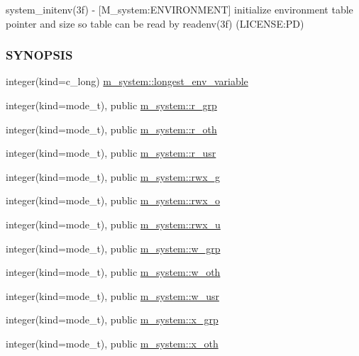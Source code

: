 \begin{DoxyCompactItemize}
\begin{DoxyCompactList}
system\+\_\+initenv(3f) -\/ \mbox{[}M\+\_\+system\+:E\+N\+V\+I\+R\+O\+N\+M\+E\+NT\mbox{]} initialize environment table pointer and size so table can be read by readenv(3f) (L\+I\+C\+E\+N\+SE\+:PD) \subsubsection*{S\+Y\+N\+O\+P\+S\+IS}\end{DoxyCompactList}\item 
integer(kind=c\+\_\+long) \mbox{\hyperlink{namespacem__system_ac066b6866f8ef4b8c358ec8daca7566c}{m\+\_\+system\+::longest\+\_\+env\+\_\+variable}}
\item 
integer(kind=mode\+\_\+t), public \mbox{\hyperlink{namespacem__system_a9f6b88434cd895d01081eead0ec994e9}{m\+\_\+system\+::r\+\_\+grp}}
\item 
integer(kind=mode\+\_\+t), public \mbox{\hyperlink{namespacem__system_a144868e3f7e98d339ba59eac96a413b7}{m\+\_\+system\+::r\+\_\+oth}}
\item 
integer(kind=mode\+\_\+t), public \mbox{\hyperlink{namespacem__system_a26b623dd9e8e115960edbb0f252ccf6b}{m\+\_\+system\+::r\+\_\+usr}}
\item 
integer(kind=mode\+\_\+t), public \mbox{\hyperlink{namespacem__system_a23010fa4addcb4c58b4cb0334a4fdec0}{m\+\_\+system\+::rwx\+\_\+g}}
\item 
integer(kind=mode\+\_\+t), public \mbox{\hyperlink{namespacem__system_a4a602e6ffd2e4b24dc7d80b5e8db3d02}{m\+\_\+system\+::rwx\+\_\+o}}
\item 
integer(kind=mode\+\_\+t), public \mbox{\hyperlink{namespacem__system_a126dc96188cde6e9932e1775868b3059}{m\+\_\+system\+::rwx\+\_\+u}}
\item 
integer(kind=mode\+\_\+t), public \mbox{\hyperlink{namespacem__system_afbbb4a0d04bc0dbaad651a6ab04ffaef}{m\+\_\+system\+::w\+\_\+grp}}
\item 
integer(kind=mode\+\_\+t), public \mbox{\hyperlink{namespacem__system_a82b69c635bb9cd191b867efdf2003d9b}{m\+\_\+system\+::w\+\_\+oth}}
\item 
integer(kind=mode\+\_\+t), public \mbox{\hyperlink{namespacem__system_ace39a3c0b26d21381c2956b78a8822d5}{m\+\_\+system\+::w\+\_\+usr}}
\item 
integer(kind=mode\+\_\+t), public \mbox{\hyperlink{namespacem__system_ae405a76caed1088a151c437d66d80eb0}{m\+\_\+system\+::x\+\_\+grp}}
\item 
integer(kind=mode\+\_\+t), public \mbox{\hyperlink{namespacem__system_a5863ec37dc7d85f9c3f20cc511d26bb4}{m\+\_\+system\+::x\+\_\+oth}}

\end{DoxyCompactItemize}
